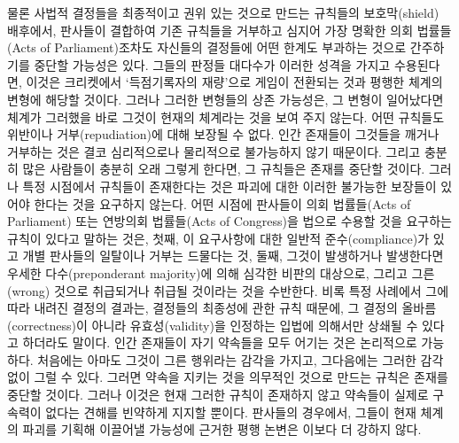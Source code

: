 물론 사법적 결정들을 최종적이고 권위 있는 것으로 만드는 규칙들의
보호막(shield) 배후에서, 판사들이 결합하여 기존 규칙들을 거부하고 심지어
가장 명확한 의회 법률들(Acts of Parliament)조차도 자신들의 결정들에 어떤
한계도 부과하는 것으로 간주하기를 중단할 가능성은 있다. 그들의 판정들
대다수가 이러한 성격을 가지고 수용된다면, 이것은 크리켓에서
‘득점기록자의 재량’으로 게임이 전환되는 것과 평행한 체계의 변형에 해당할
것이다. 그러나 그러한 변형들의 상존 가능성은, 그 변형이 일어났다면
체계가 그러했을 바로 그것이 현재의 체계라는 것을 보여 주지 않는다. 어떤
규칙들도 위반이나 거부(repudiation)에 대해 보장될 수 없다. 인간 존재들이
그것들을 깨거나 거부하는 것은 결코 심리적으로나 물리적으로 불가능하지
않기 때문이다. 그리고 충분히 많은 사람들이 충분히 오래 그렇게 한다면, 그
규칙들은 존재를 중단할 것이다. 그러나 특정 시점에서 규칙들이 존재한다는
것은 파괴에 대한 이러한 불가능한 보장들이 있어야 한다는 것을 요구하지
않는다. 어떤 시점에 판사들이 의회 법률들(Acts of Parliament) 또는
연방의회 법률들(Acts of Congress)을 법으로 수용할 것을 요구하는 규칙이
있다고 말하는 것은, 첫째, 이 요구사항에 대한 일반적 준수(compliance)가
있고 개별 판사들의 일탈이나 거부는 드물다는 것, 둘째, 그것이 발생하거나
발생한다면 우세한 다수(preponderant majority)에 의해 심각한 비판의
대상으로, 그리고 그른(wrong) 것으로 취급되거나 취급될 것이라는 것을
수반한다. 비록 특정 사례에서 그에 따라 내려진 결정의 결과는, 결정들의
최종성에 관한 규칙 때문에, 그 결정의 올바름(correctness)이 아니라
유효성(validity)을 인정하는 입법에 의해서만 상쇄될 수 있다고 하더라도
말이다. 인간 존재들이 자기 약속들을 모두 어기는 것은 논리적으로
가능하다. 처음에는 아마도 그것이 그른 행위라는 감각을 가지고, 그다음에는
그러한 감각 없이 그럴 수 있다. 그러면 약속을 지키는 것을 의무적인 것으로
만드는 규칙은 존재를 중단할 것이다. 그러나 이것은 현재 그러한 규칙이
존재하지 않고 약속들이 실제로 구속력이 없다는 견해를 빈약하게 지지할
뿐이다. 판사들의 경우에서, 그들이 현재 체계의 파괴를 기획해 이끌어낼
가능성에 근거한 평행 논변은 이보다 더 강하지 않다.


